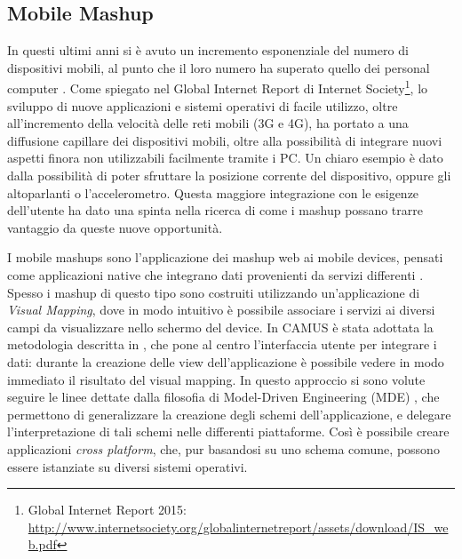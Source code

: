 \subsection{Mobile Mashup\label{sec:mobile-mashup}}

In questi ultimi anni si è avuto un incremento esponenziale del numero di dispositivi mobili, al punto che il loro numero ha superato quello dei personal computer \cite{10.1109/ICSC.2008.100}. Come spiegato nel Global Internet Report di Internet Society\footnote{Global Internet Report 2015: \url{http://www.internetsociety.org/globalinternetreport/assets/download/IS_web.pdf}}, lo sviluppo di nuove applicazioni e sistemi operativi di facile utilizzo, oltre all'incremento della velocità delle reti mobili (3G e 4G), ha portato a una diffusione capillare dei dispositivi mobili, oltre alla possibilità di integrare nuovi aspetti finora non utilizzabili facilmente tramite i PC. Un chiaro esempio è dato dalla possibilità di poter sfruttare la posizione corrente del dispositivo, oppure gli altoparlanti o l'accelerometro.
Questa maggiore integrazione con le esigenze dell'utente ha dato una spinta nella ricerca di come i mashup possano trarre vantaggio da queste nuove opportunità.

I mobile mashups sono l'applicazione dei mashup web ai mobile devices, pensati come applicazioni native che integrano dati provenienti da servizi differenti \cite{Cappiello2013}. 
Spesso i mashup di questo tipo sono costruiti utilizzando un'applicazione di \emph{Visual Mapping}, dove in modo intuitivo è possibile associare i servizi ai diversi campi da visualizzare nello schermo del device.
In CAMUS è stata adottata la metodologia descritta in \cite{Cappiello:2015:UAE:2788341.2735632}, che pone al centro l'interfaccia utente per integrare i dati: durante la creazione delle view dell'applicazione è possibile vedere in modo immediato il risultato del visual mapping. In questo approccio si sono volute seguire le linee dettate dalla filosofia di Model-Driven Engineering (MDE) \cite{schmidt2006model}, che permettono di generalizzare la creazione degli schemi dell'applicazione, e delegare l'interpretazione di tali schemi nelle differenti piattaforme. Così è possibile creare applicazioni \emph{cross platform}, che, pur basandosi su uno schema comune, possono essere istanziate su diversi sistemi operativi. 

